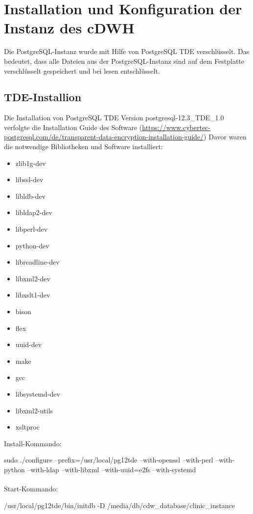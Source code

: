 \chapter{Installation und Konfiguration der Instanz des \ac{cDWH}}
    
    Die PostgreSQL-Instanz wurde mit Hilfe von PostgreSQL \ac{TDE} verschlüsselt. Das bedeutet, dass alle Dateien aus der PostgreSQL-Instanz sind auf dem Festplatte verschlüsselt gespeichert und bei lesen entschlüsselt.
    \section{\ac{TDE}-Installion}    
    Die Installation von PostgreSQL \ac{TDE} Version postgresql-12.3\_TDE\_1.0 verfolgte die Installation Guide des Software (\url{https://www.cybertec-postgresql.com/de/transparent-data-encryption-installation-guide/}) Davor waren die notwendige Bibliotheken und Software installiert:
    \begin{itemize}
    	\item zlib1g-dev   
    	\item libssl-dev
    	\item libldb-dev
    	\item libldap2-dev
    	\item libperl-dev
    	\item python-dev
    	\item libreadline-dev
    	\item libxml2-dev
    	\item libxslt1-dev
    	\item bison
    	\item flex
    	\item uuid-dev
    	\item make
    	\item gcc
    	\item libsystemd-dev
    	\item libxml2-utils
    	\item xsltproc
    \end{itemize}
    Install-Kommando: 
    
       
    sudo ./configure --prefix=/usr/local/pg12tde --with-openssl --with-perl --with-python --with-ldap --with-libxml --with-uuid=e2fs --with-systemd\\ \\
    Start-Kommando: 
    
    /usr/local/pg12tde/bin/initdb -D /media/db/cdw\_database/clinic\_instance
    

